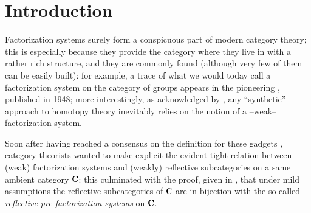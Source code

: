 \section*{Introduction}
Factorization systems surely form a conspicuous part of modern category theory; this is especially because they provide the category where they live in with a rather rich structure, and they are commonly found (although very few of them can be easily built): for example, a trace of what we would today call a factorization system on the category of groups appears in the pioneering \cite{maclane1948groups}, published in 1948; more interestingly, as acknowledged by \cite{whitehead61elements}, any ``synthetic'' approach to homotopy theory inevitably relies on the notion of a --weak-- factorization system.

Soon after having reached a consensus on the definition for these gadgets \cite{FK}, category theorists wanted to make explicit the evident tight relation between (weak) factorization systems and (weakly) reflective subcategories on a same ambient category $\C$: this culminated with the proof, given in \cite{CHK}, that under mild assumptions the reflective subcategories of $\C$ are in bijection with the so-called \emph{reflective pre-factorization systems} on $\C$.

